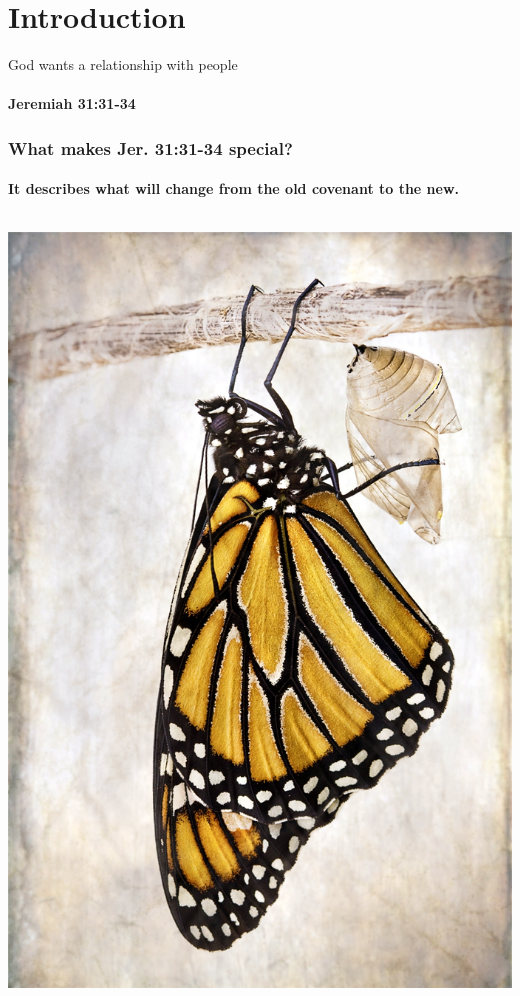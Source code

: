 
\section{Introduction}

\begin{frame}{God wants a relationship with people}
\framesubtitle{Jeremiah 31:31-34}
\keyverse	
{}
\end{frame}

\begin{frame}
\frametitle{What makes Jer. 31:31-34 special?}
\framesubtitle{It describes what will change from the old covenant to the new.}
\begin{columns}
\begin{column}{0.4\textwidth}
\includegraphics[width=\columnwidth]{figures/metamorphosis.jpg}

\end{column}
\end{columns}
\end{frame}
